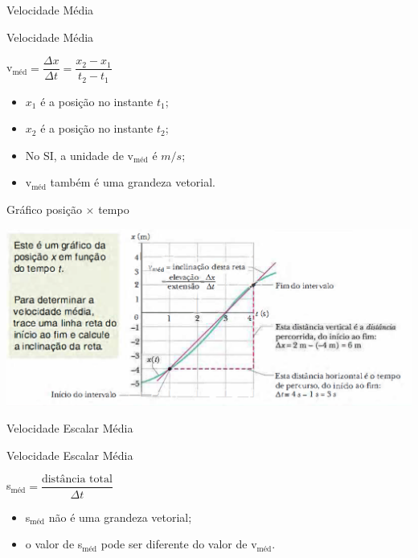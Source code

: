\documentclass[xcolor=dvipsnames,table]{beamer}
\begin{document}
	\begin{frame}{Velocidade Média}
		\begin{block}{Velocidade Média}
			\begin{center}
				v$_{\mbox{méd}} = \dfrac{\Delta x}{\Delta t} = \dfrac{x_2 - x_1}{t_2 - t_1}$
			\end{center} \pause
			\begin{itemize}
				\item $x_1$ é a posição no instante $t_1$; \pause
				\item $x_2$ é a posição no instante $t_2$; \pause
				\item No SI, a unidade de v$_{\mbox{méd}}$ é $m/s$; \pause
				\item v$_{\mbox{méd}}$ também é uma grandeza vetorial.
			\end{itemize}
		\end{block}
	\end{frame}

	\begin{frame}{Gráfico posição $\times$ tempo}
		\begin{center}
			\includegraphics[scale=0.35]{images/fig2-4}
		\end{center}
	\end{frame}

	\begin{frame}{Velocidade Escalar Média}
		\begin{block}{Velocidade Escalar Média}
			\begin{center}
				s$_{\mbox{méd}} = \dfrac{\mbox{distância total}}{\Delta t} $
			\end{center} \pause
			\begin{itemize}
				\item s$_{\mbox{méd}}$ não é uma grandeza vetorial;
				\item o valor de s$_{\mbox{méd}}$ pode ser diferente do valor de v$_{\mbox{méd}}$.
			\end{itemize}
		\end{block}
	\end{frame}
\end{document}
